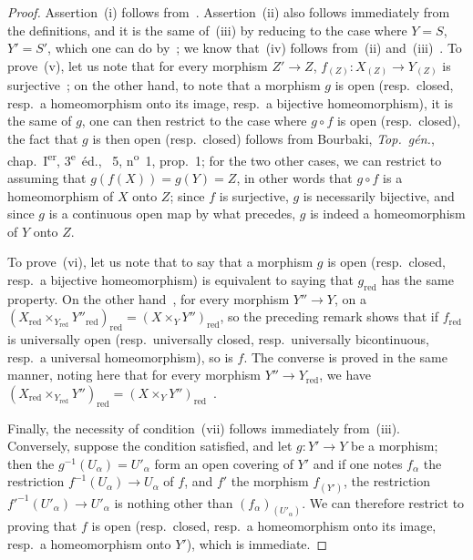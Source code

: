 \begin{proof}
Assertion~(i) follows from~.
Assertion~(ii) also follows immediately from the definitions, and it is the same of~(iii) by reducing to the case where $Y=S$, $Y'=S'$, which one can do by~; we know that~(iv) follows from~(ii) and~(iii)~.
To prove~(v), let us note that for every morphism $Z'\to Z$, $f_{(Z)}:X_{(Z)}\to Y_{(Z)}$ is surjective~; on the other hand, to note that a morphism $g$ is open (resp.\ closed, resp.\ a homeomorphism onto its image, resp.\ a bijective homeomorphism), it is the same of $g$, one can then restrict to the case where $g\circ f$ is open (resp.\ closed), the fact that $g$ is then open (resp.\ closed) follows from Bourbaki, \emph{Top.~g\'{e}n.}, chap.~I\textsuperscript{er}, 3\textsuperscript{e}~\'{e}d., \textsection~5, n\textsuperscript{o}~1, prop.~1; for the two other cases, we can restrict to assuming that $g(f(X))=g(Y)=Z$, in other words that $g\circ f$ is a homeomorphism of $X$ onto $Z$; since $f$ is surjective, $g$ is necessarily bijective, and since $g$ is a continuous open map by what precedes, $g$ is indeed a homeomorphism of $Y$ onto $Z$.

To prove~(vi), let us note that to say that a morphism $g$ is open (resp.\ closed, resp.\ a bijective homeomorphism) is equivalent to saying that $g_{\mathrm{red}}$ has the same property.
On the other hand~, for every morphism $Y''\to Y$, on a $(X_{\mathrm{red}}\times_{Y_{\mathrm{red}}}Y''_{\mathrm{red}})_{\mathrm{red}}=(X\times_Y Y'')_{\mathrm{red}}$, so the preceding remark shows that if $f_{\mathrm{red}}$ is universally open (resp.\ universally closed, resp.\ universally bicontinuous, resp.\ a universal homeomorphism), so is $f$.
The converse is proved in the same manner, noting here that for every morphism $Y''\to Y_{\mathrm{red}}$, we have $(X_{\mathrm{red}}\times_{Y_{\mathrm{red}}}Y'')_{\mathrm{red}}=(X\times_Y Y'')_{\mathrm{red}}$~.

Finally, the necessity of condition~(vii) follows immediately from~(iii).
Conversely, suppose the condition satisfied, and let $g:Y'\to Y$ be a morphism; then the $g^{-1}(U_\alpha)=U'_\alpha$ form an open covering of $Y'$ and if one notes $f_\alpha$ the restriction $f^{-1}(U_\alpha)\to U_\alpha$ of $f$, and $f'$ the morphism $f_{(Y')}$, the restriction $f'^{-1}(U'_\alpha)\to U'_\alpha$ is nothing other than $(f_\alpha)_{(U'_\alpha)}$.
We can therefore restrict to proving that $f$ is open (resp.\ closed, resp.\ a homeomorphism onto its image, resp.\ a homeomorphism onto $Y'$), which is immediate.
\end{proof}

